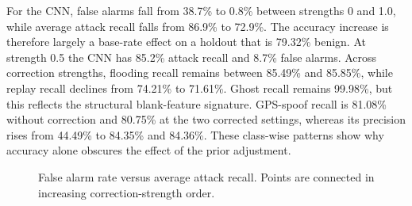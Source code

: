 \documentclass[conference]{IEEEtran}
\begin{document}
For the CNN, false alarms fall from 38.7\% to 0.8\% between strengths 0 and 1.0, while average attack recall falls from 86.9\% to 72.9\%. The accuracy increase is therefore largely a base-rate effect on a holdout that is 79.32\% benign. At strength 0.5 the CNN has 85.2\% attack recall and 8.7\% false alarms. Across correction strengths, flooding recall remains between 85.49\% and 85.85\%, while replay recall declines from 74.21\% to 71.61\%. Ghost recall remains 99.98\%, but this reflects the structural blank-feature signature. GPS-spoof recall is 81.08\% without correction and 80.75\% at the two corrected settings, whereas its precision rises from 44.49\% to 84.35\% and 84.36\%. These class-wise patterns show why accuracy alone obscures the effect of the prior adjustment.
\begin{figure}[t]\centering{}\caption{False alarm rate versus average attack recall. Points are connected in increasing correction-strength order.}\label{fig:tradeoff}\end{figure}
\end{document}
